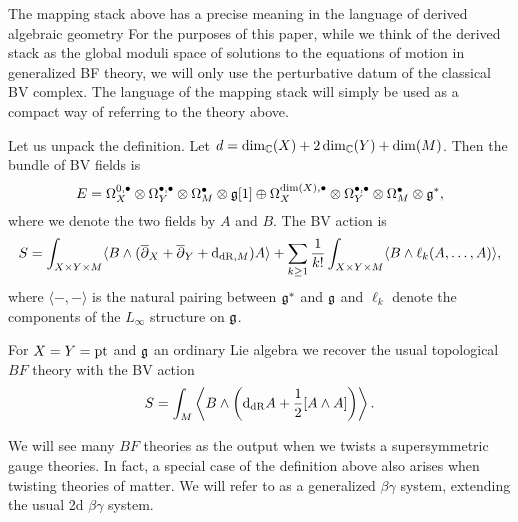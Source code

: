 \documentclass[10pt, oneside]{article}
\begin{document}
\begin{remark} \label{mapping_stack_remark}
The mapping stack above has a precise meaning in the language of derived algebraic geometry   For the purposes of this paper, while we think of the derived stack as the global moduli space of solutions to the equations of motion in generalized BF theory, we will only use the perturbative datum of the classical BV complex.  The language of the mapping stack will simply be used as a compact way of referring to the theory above. 
\end{remark}

Let us unpack the definition. Let $d = \dim_\mathbb C(X) + 2\dim_\mathbb C(Y) + \dim(M)$. Then the bundle of BV fields is
\[E = \Omega^{0,\bullet}_X \otimes \Omega^{\bullet,\bullet}_Y \otimes \Omega^\bullet_M \otimes \mathfrak g[1]\oplus \Omega^{\dim(X),\bullet}_X \otimes \Omega^{\bullet,\bullet}_Y \otimes \Omega^\bullet_M\otimes \mathfrak g^*,\]
 where we denote the two fields by $A$ and $B$. The BV action is
\[S = \int_{X\times Y\times M} \langle B\wedge (\overline{\partial}_X + \overline{\partial}_Y + {\rm d}_{\mathrm{dR}, M}) A\rangle + \sum_{k\geq 1}\frac{1}{k!} \int_{X\times Y\times M} \langle B\wedge \ell_k(A, \dots, A)\rangle,\]
where $\langle -, -\rangle$ is the natural pairing between $\mathfrak g^*$ and $\mathfrak g$ and $\ell_k$ denote the components of the $L_\infty$ structure on $\mathfrak g$.

\begin{example}
For $X=Y=\operatorname{pt}$ and $\mathfrak g$ an ordinary Lie algebra we recover the usual topological $BF$ theory with the BV action
\[S = \int_M \left\langle B\wedge \left({\rm d}_{\mathrm{dR}} A+ \frac{1}{2}[A\wedge A]\right)\right\rangle.\]
\end{example}

We will see many $BF$ theories as the output when we twists a supersymmetric gauge theories.
In fact, a special case of the definition above also arises when twisting theories of matter.  We will refer to as a generalized $\beta\gamma$ system, extending the usual 2d $\beta \gamma$ system. 
\end{document}
